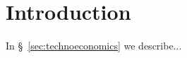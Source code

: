 \tableofcontents
\listoffigures
\listoftables
\newpage

\section{Introduction}\label{sec:introduction}

In \S~\ref{sec:technoeconomics} we describe...